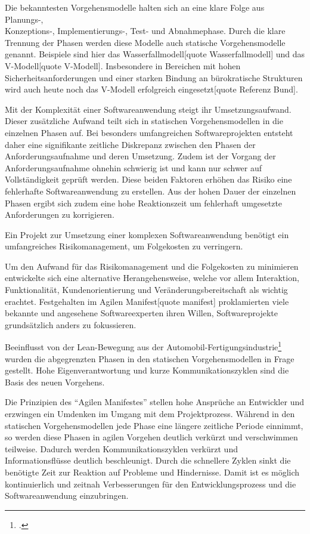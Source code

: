 Die bekanntesten Vorgehensmodelle halten sich an eine klare Folge aus Planungs-,\\ Konzeptions-, Implementierungs-, 
Test- und Abnahmephase. Durch die klare Trennung der Phasen werden diese Modelle auch statische Vorgehensmodelle genannt.
Beispiele sind hier das Wasserfallmodell[quote Wasserfallmodell] und das V-Modell[quote V-Modell]. Insbesondere in
Bereichen mit hohen Sicherheitsanforderungen und einer starken Bindung an bürokratische Strukturen wird auch heute noch
das V-Modell erfolgreich eingesetzt[quote Referenz Bund].

Mit der Komplexität einer Softwareanwendung steigt ihr Umsetzungsaufwand. Dieser zusätzliche Aufwand teilt sich in
statischen Vorgehensmodellen in die einzelnen Phasen auf. Bei besonders umfangreichen Softwareprojekten entsteht daher
eine signifikante zeitliche Diskrepanz zwischen den Phasen der Anforderungsaufnahme und deren Umsetzung. 
Zudem ist der Vorgang der Anforderungsaufnahme ohnehin schwierig ist und kann nur schwer auf Vollständigkeit geprüft
werden. Diese beiden Faktoren erhöhen das Risiko eine fehlerhafte Softwareanwendung zu erstellen. Aus der hohen Dauer der
einzelnen Phasen ergibt sich zudem eine hohe Reaktionszeit um fehlerhaft umgesetzte Anforderungen zu korrigieren.

Ein Projekt zur Umsetzung einer komplexen Softwareanwendung benötigt ein umfangreiches Risikomanagement, um Folgekosten 
zu verringern.

Um den Aufwand für das Risikomanagement und die Folgekosten zu minimieren entwickelte sich eine alternative
Herangehensweise, welche vor allem Interaktion, Funktionalität, Kundenorientierung und Veränderungsbereitschaft als
wichtig erachtet. Festgehalten im Agilen Manifest[quote manifest] proklamierten viele bekannte und angesehene
Softwareexperten ihren Willen, Softwareprojekte grundsätzlich anders zu fokussieren.

Beeinflusst von der Lean-Bewegung aus der Automobil-Fertigungsindustrie\footcite{kent1999} wurden die abgegrenzten Phasen 
in den statischen Vorgehensmodellen in Frage gestellt. Hohe Eigenverantwortung und kurze Kommunikationszyklen sind die 
Basis des neuen Vorgehens.

Die Prinzipien des ``Agilen Manifestes'' stellen hohe Ansprüche an Entwickler und erzwingen ein Umdenken im Umgang mit dem Projektprozess. Während in den statischen Vorgehensmodellen jede Phase eine längere zeitliche Periode einnimmt, so werden diese Phasen in agilen Vorgehen deutlich verkürzt und verschwimmen teilweise. Dadurch werden Kommunikationszyklen verkürzt und Informationsflüsse deutlich beschleunigt.
Durch die schnellere Zyklen sinkt die benötigte Zeit zur Reaktion auf Probleme und Hindernisse. Damit ist es möglich kontinuierlich und zeitnah Verbesserungen für den Entwicklungsprozess und die Softwareanwendung einzubringen. 

